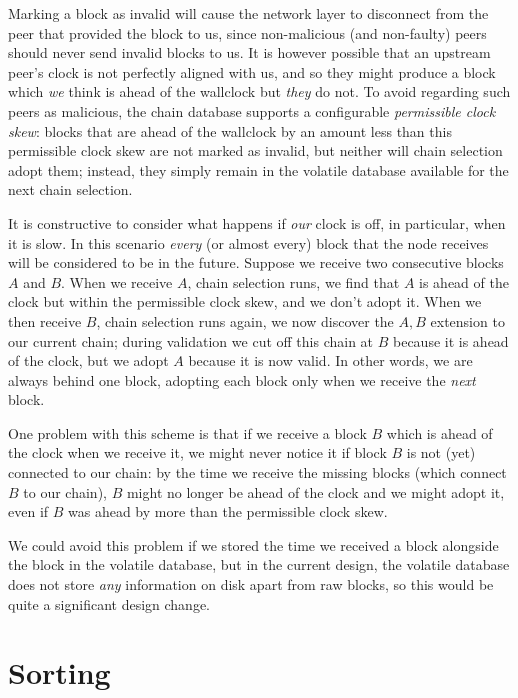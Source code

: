 Marking a block as invalid will cause the network layer to disconnect from the
peer that provided the block to us, since non-malicious (and non-faulty) peers
should never send invalid blocks to us. It is however possible that an upstream
peer's clock is not perfectly aligned with us, and so they might produce a block
which \emph{we} think is ahead of the wallclock but \emph{they} do not. To avoid
regarding such peers as malicious, the chain database supports a configurable
\emph{permissible clock skew}: blocks that are ahead of the wallclock by an
amount less than this permissible clock skew are not marked as invalid, but
neither will chain selection adopt them; instead, they simply remain in the
volatile database available for the next chain selection.

It is constructive to consider what happens if \emph{our} clock is off, in
particular, when it is slow. In this scenario \emph{every} (or almost every)
block that the node receives will be considered to be in the future. Suppose we
receive two consecutive blocks $A$ and $B$. When we receive $A$, chain selection
runs, we find that $A$ is ahead of the clock but within the permissible clock
skew, and we don't adopt it. When we then receive $B$, chain selection runs
again, we now discover the $A, B$ extension to our current chain; during
validation we cut off this chain at $B$ because it is ahead of the clock, but we
adopt $A$ because it is now valid.  In other words, we are always behind one
block, adopting each block only when we receive the \emph{next} block.

\begin{bug}
One problem with this scheme is that if we receive a block $B$ which is ahead of
the clock when we receive it, we might never notice it if block $B$ is not (yet)
connected to our chain: by the time we receive the missing blocks (which connect
$B$ to our chain), $B$ might no longer be ahead of the clock and we might adopt
it, even if $B$ was ahead by more than the permissible clock skew.

We could avoid this problem if we stored the time we received a block alongside
the block in the volatile database, but in the current design, the volatile
database does not store \emph{any} information on disk apart from raw blocks,
so this would be quite a significant design change.
\end{bug}

\section{Sorting}

